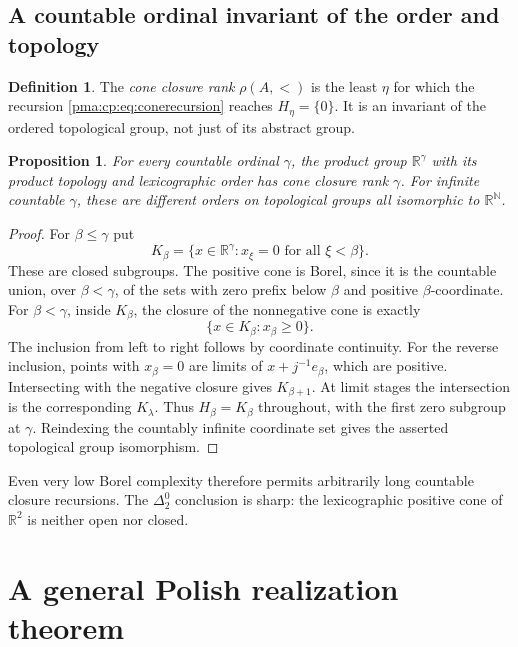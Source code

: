 \documentclass[11pt]{article}
\numberwithin{equation}{section}
\newtheorem{proposition}[proposition]{Proposition}
\theoremstyle{definition}
\newtheorem{definition}[definition]{Definition}
\theoremstyle{remark}
\newcommand{\N}{\mathbb N}
\newcommand{\R}{\mathbb R}
\begin{document}
\subsection{A countable ordinal invariant of the order and topology}

\begin{definition}
The \emph{cone closure rank} $\rho(A,<)$ is the least $\eta$ for which the
recursion \eqref{pma:cp:eq:conerecursion} reaches $H_\eta=\{0\}$.
It is an invariant of the ordered topological group, not just of its
abstract group.
\end{definition}

\begin{proposition}
\label{pma:cp:prop:coneranks}
For every countable ordinal $\gamma$, the product group $\R^\gamma$ with
its product topology and lexicographic order has cone closure rank $\gamma$.
For infinite countable $\gamma$, these are different orders on topological
groups all isomorphic to $\R^{\N}$.
\end{proposition}

\begin{proof}
For $\beta\leq\gamma$ put
\[
K_\beta=\{x\in\R^\gamma:x_\xi=0\text{ for all }\xi<\beta\}.
\]
These are closed subgroups. The positive cone is Borel, since it is the
countable union, over $\beta<\gamma$, of the sets with zero prefix below
$\beta$ and positive $\beta$-coordinate. For $\beta<\gamma$, inside
$K_\beta$, the closure
of the nonnegative cone is exactly
\[
\{x\in K_\beta:x_\beta\geq0\}.
\]
The inclusion from left to right follows by coordinate continuity. For
the reverse inclusion, points with $x_\beta=0$ are limits of
$x+j^{-1}e_\beta$, which are positive. Intersecting with the negative
closure gives $K_{\beta+1}$. At limit stages the intersection is the
corresponding $K_\lambda$. Thus $H_\beta=K_\beta$ throughout, with the
first zero subgroup at $\gamma$. Reindexing the countably infinite
coordinate set gives the asserted topological group isomorphism.
\end{proof}

Even very low Borel complexity therefore permits arbitrarily long countable
closure recursions. The $\Delta^0_2$ conclusion is sharp: the lexicographic
positive cone of $\R^2$ is neither open nor closed.

\section{A general Polish realization theorem}
\label{pma:cp:sec:general}
\end{document}
